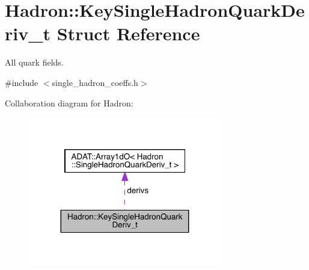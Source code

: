 \hypertarget{structHadron_1_1KeySingleHadronQuarkDeriv__t}{}\section{Hadron\+:\+:Key\+Single\+Hadron\+Quark\+Deriv\+\_\+t Struct Reference}
\label{structHadron_1_1KeySingleHadronQuarkDeriv__t}


All quark fields.  




{\ttfamily \#include $<$single\+\_\+hadron\+\_\+coeffs.\+h$>$}



Collaboration diagram for Hadron\+:\nopagebreak
\begin{figure}[H]
\begin{center}
\leavevmode
\includegraphics[width=239pt]{d6/d74/structHadron_1_1KeySingleHadronQuarkDeriv__t__coll__graph}
\end{center}
\end{figure}
